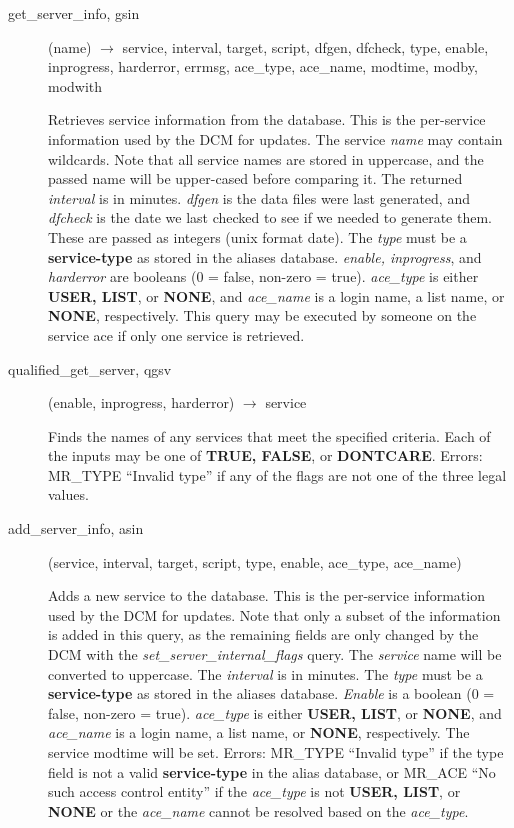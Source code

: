 \documentclass{article}
\begin{document}
\begin{description}

\item[get\_server\_info, gsin](name) $\rightarrow$ service, interval, target,
script, dfgen, dfcheck, type, enable, inprogress, harderror, errmsg,
ace\_type, ace\_name, modtime, modby, modwith

Retrieves service information from the database.  This is the
per-service information used by the DCM for updates.  The service
{\em name} may contain wildcards.  Note that all service names are
stored in uppercase, and the passed name will be upper-cased before
comparing it.  The returned {\em interval} is in minutes.  {\em dfgen} is
the data files were last generated, and {\em dfcheck} is the date we
last checked to see if we needed to generate them.  These are passed
as integers (unix format date).  The {\em type} must be a
{\bf service-type} as stored in the aliases database.  {\em enable,
inprogress}, and {\em harderror} are booleans (0 = false, non-zero =
true).  {\em ace\_type} is either {\bf USER, LIST}, or {\bf NONE}, and
{\em ace\_name} is a login name, a list name, or {\bf NONE}, respectively.
This query may be executed by someone on the service ace if only one
service is retrieved.

\item[qualified\_get\_server, qgsv](enable, inprogress, harderror)
$\rightarrow$ service

Finds the names of any services that meet the specified criteria.
Each of the inputs may be one of {\bf TRUE, FALSE}, or {\bf DONTCARE}.
Errors: MR\_TYPE ``Invalid type'' if any of the flags are not one of the
three legal values.

\item[add\_server\_info, asin](service, interval, target, script, type, enable,
ace\_type, ace\_name)

Adds a new service to the database.  This is the per-service
information used by the DCM for updates.  Note that only a subset of
the information is added in this query, as the remaining fields are
only changed by the DCM with the {\em set\_server\_internal\_flags} query.
The {\em service} name will be converted to uppercase.  The {\em interval}
is in minutes.  The {\em type} must be a {\bf service-type} as stored in
the aliases database.  {\em Enable} is a boolean (0 = false, non-zero =
true).  {\em ace\_type} is either {\bf USER, LIST}, or {\bf NONE}, and
{\em ace\_name} is a login name, a list name, or {\bf NONE}, respectively.
The service modtime will be set.  Errors: MR\_TYPE ``Invalid type'' if
the type field is not a valid {\bf service-type} in the alias database,
or MR\_ACE ``No such access control entity'' if the {\em ace\_type} is not
{\bf USER, LIST}, or {\bf NONE} or the {\em ace\_name} cannot be resolved
based on the {\em ace\_type}.


\end{description}
\end{document}
